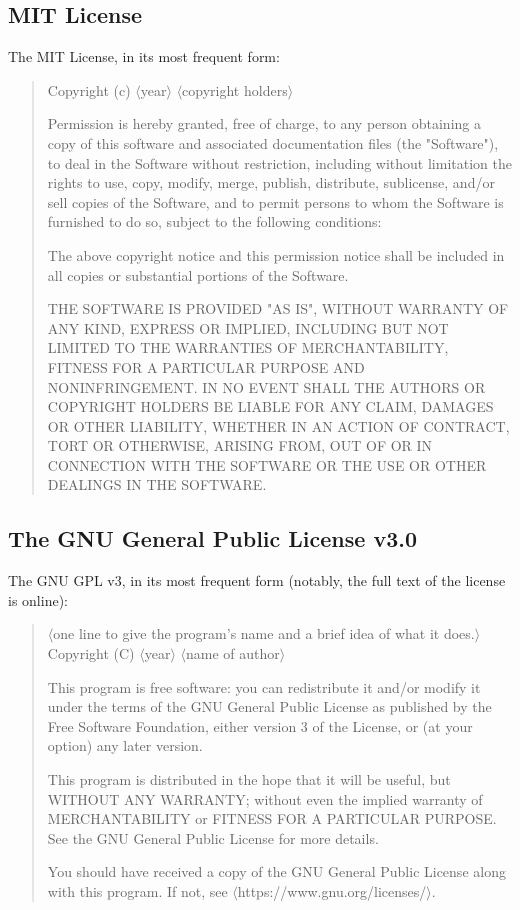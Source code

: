 \documentclass[12pt,a4paper]{article}
\begin{document}
\subsection{MIT License}
The MIT License, in its most frequent form:

\begin{quote}
Copyright (c) $\langle$year$\rangle$ $\langle$copyright holders$\rangle$

Permission is hereby granted, free of charge, to any person obtaining a copy
of this software and associated documentation files (the "Software"), to deal
in the Software without restriction, including without limitation the rights
to use, copy, modify, merge, publish, distribute, sublicense, and/or sell
copies of the Software, and to permit persons to whom the Software is
furnished to do so, subject to the following conditions:

The above copyright notice and this permission notice shall be included in all
copies or substantial portions of the Software.

THE SOFTWARE IS PROVIDED "AS IS", WITHOUT WARRANTY OF ANY KIND, EXPRESS OR
IMPLIED, INCLUDING BUT NOT LIMITED TO THE WARRANTIES OF MERCHANTABILITY,
FITNESS FOR A PARTICULAR PURPOSE AND NONINFRINGEMENT. IN NO EVENT SHALL THE
AUTHORS OR COPYRIGHT HOLDERS BE LIABLE FOR ANY CLAIM, DAMAGES OR OTHER
LIABILITY, WHETHER IN AN ACTION OF CONTRACT, TORT OR OTHERWISE, ARISING FROM,
OUT OF OR IN CONNECTION WITH THE SOFTWARE OR THE USE OR OTHER DEALINGS IN THE
SOFTWARE. \cite{mit-license}
\end{quote}

\subsection{The GNU General Public License v3.0}
The GNU GPL v3, in its most frequent form (notably, the full text of the license is online):

\begin{quote}
$\langle$one line to give the program's name and a brief idea of what it does.$\rangle$
Copyright (C) $\langle$year$\rangle$  $\langle$name of author$\rangle$

This program is free software: you can redistribute it and/or modify
it under the terms of the GNU General Public License as published by
the Free Software Foundation, either version 3 of the License, or
(at your option) any later version.

This program is distributed in the hope that it will be useful,
but WITHOUT ANY WARRANTY; without even the implied warranty of
MERCHANTABILITY or FITNESS FOR A PARTICULAR PURPOSE.  See the
GNU General Public License for more details.

You should have received a copy of the GNU General Public License
along with this program.  If not, see $\langle$https://www.gnu.org/licenses/$\rangle$. \cite{gplv3}
\end{quote}
\end{document}

